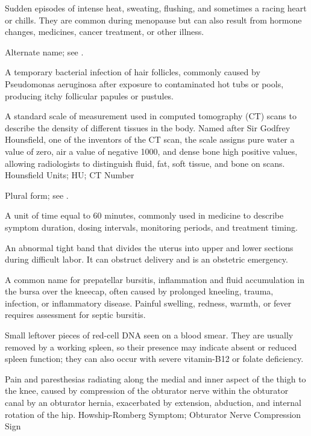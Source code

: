  Sudden episodes of intense heat, sweating, flushing, and sometimes a racing heart or chills. They are common during menopause but can also result from hormone changes, medicines, cancer treatment, or other illness.

 Alternate name; see .

 A temporary bacterial infection of hair follicles, commonly caused by Pseudomonas aeruginosa after exposure to contaminated hot tubs or pools, producing itchy follicular papules or pustules.

 A standard scale of measurement used in computed tomography (CT) scans to describe the density of different tissues in the body. Named after Sir Godfrey Hounsfield, one of the inventors of the CT scan, the scale assigns pure water a value of zero, air a value of negative 1000, and dense bone high positive values, allowing radiologists to distinguish fluid, fat, soft tissue, and bone on scans.
\synonyms
Hounsfield Units; HU; CT Number

 Plural form; see .

 A unit of time equal to 60 minutes, commonly used in medicine to describe symptom duration, dosing intervals, monitoring periods, and treatment timing.

 An abnormal tight band that divides the uterus into upper and lower sections during difficult labor. It can obstruct delivery and is an obstetric emergency.

 A common name for prepatellar bursitis, inflammation and fluid accumulation in the bursa over the kneecap, often caused by prolonged kneeling, trauma, infection, or inflammatory disease. Painful swelling, redness, warmth, or fever requires assessment for septic bursitis.

 Small leftover pieces of red-cell DNA seen on a blood smear. They are usually removed by a working spleen, so their presence may indicate absent or reduced spleen function; they can also occur with severe vitamin-B12 or folate deficiency.

 Pain and paresthesias radiating along the medial and inner aspect of the thigh to the knee, caused by compression of the obturator nerve within the obturator canal by an obturator hernia, exacerbated by extension, abduction, and internal rotation of the hip.
\synonyms
Howship-Romberg Symptom; Obturator Nerve Compression Sign

